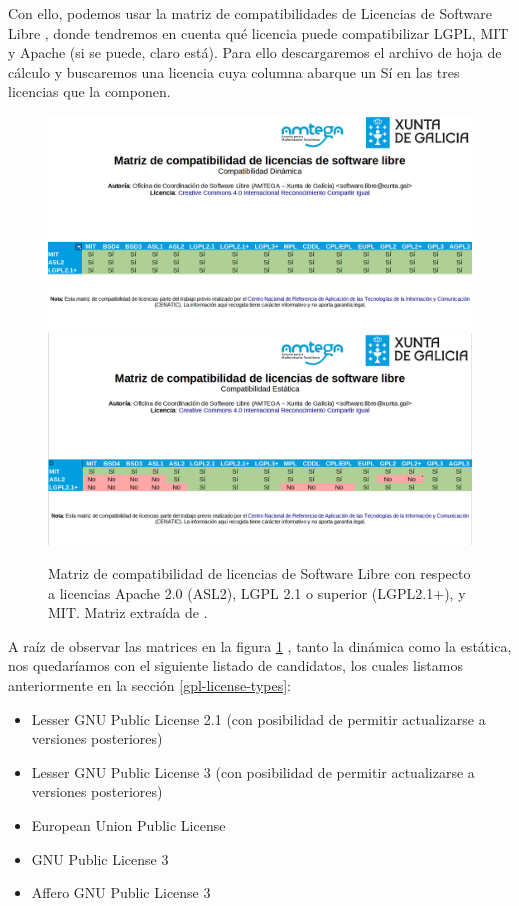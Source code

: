 Con ello, podemos usar la matriz de compatibilidades de Licencias de Software Libre \cite{matriz-licencias}, donde tendremos en cuenta qué licencia puede compatibilizar LGPL, MIT y Apache (si se puede, claro está). Para ello descargaremos el archivo de hoja de cálculo y buscaremos una licencia cuya columna abarque un Sí en las tres licencias que la componen.

\begin{center}
	\begin{figure}[h]
		\includegraphics[width=\textwidth]{imagenes/MatrizCompatibilidadDinamica.png}
		\includegraphics[width=\textwidth]{imagenes/MatrizCompatibilidadEstatica.png}
		\caption{Matriz de compatibilidad de licencias de Software Libre con respecto a licencias Apache 2.0 (ASL2), LGPL 2.1 o superior (LGPL2.1+), y MIT. Matriz extraída de \cite{matriz-licencias}.}
		\label{fig:matrices-comp}
	\end{figure}
\end{center}

A raíz de observar las matrices en la figura \ref{fig:matrices-comp} , tanto la dinámica como la estática, nos quedaríamos con el siguiente listado de candidatos, los cuales listamos anteriormente en la sección \ref{gpl-license-types}:
\begin{itemize}
	\item Lesser GNU Public License 2.1 (con posibilidad de permitir actualizarse a versiones posteriores)
	\item Lesser GNU Public License 3 (con posibilidad de permitir actualizarse a versiones posteriores)
	\item European Union Public License
	\item GNU Public License 3
	\item Affero GNU Public License 3
\end{itemize}


